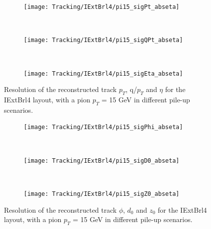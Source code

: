 \documentclass[a4paper,twoside,12pt]{book}
\begin{document}
\begin{figure}
\begin{subfigure}{\linewidth}
\centering
\texttt{[image: Tracking/IExtBrl4/pi15\_sigPt\_abseta]}
\caption{}
\label{fig:tracking:pi15_sigPt_abseta_IExtBrl4}
\end{subfigure}\\[1ex]
\begin{subfigure}{\linewidth}
\centering
\texttt{[image: Tracking/IExtBrl4/pi15\_sigQPt\_abseta]}
\caption{}
\label{fig:tracking:pi15_sigQPt_abseta_IExtBrl4}
\end{subfigure}\\[1ex]
\begin{subfigure}{\linewidth}
\centering
\texttt{[image: Tracking/IExtBrl4/pi15\_sigEta\_abseta]}
\caption{}
\label{fig:tracking:pi15_sigEta_abseta_IExtBrl4}
\end{subfigure}
\caption{Resolution of the reconstructed track $p_{T}$, q/$p_{T}$ and $\eta$ for the IExtBrl4 layout, with a pion $p_{T}$ = 15 GeV in different pile-up scenarios.}
\label{fig:tracking:resolutionPileup_IExtBrl4-1}
\end{figure}

\begin{figure}
\begin{subfigure}{\linewidth}
\centering
\texttt{[image: Tracking/IExtBrl4/pi15\_sigPhi\_abseta]}
\caption{}
\label{fig:tracking:pi15_sigPhi_abseta_IExtBrl4}
\end{subfigure}\\[1ex]
\begin{subfigure}{\linewidth}
\centering
\texttt{[image: Tracking/IExtBrl4/pi15\_sigD0\_abseta]}
\caption{}
\label{fig:tracking:pi15_sigD0_abseta_IExtBrl4}
\end{subfigure}\\[1ex]
\begin{subfigure}{\linewidth}
\centering
\texttt{[image: Tracking/IExtBrl4/pi15\_sigZ0\_abseta]}
\caption{}
\label{fig:tracking:pi15_sigZ0_abseta_IExtBrl4}
\end{subfigure}
\caption{Resolution of the reconstructed track $\phi$, $d_{0}$ and $z_{0}$ for the IExtBrl4 layout, with a pion $p_{T}$ = 15 GeV in different pile-up scenarios.}
\label{fig:tracking:resolutionPileup_IExtBrl4-2}
\end{figure}

\end{document}

